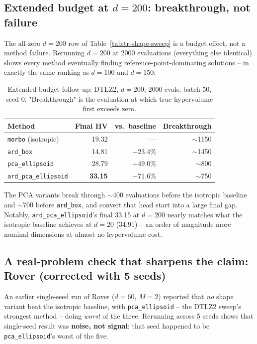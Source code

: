\documentclass[11pt]{article}
\begin{document}
\subsection{Extended budget at $d=200$: breakthrough, not failure}

The all-zero $d=200$ row of Table~\ref{tab:tr-shape-sweep} is a budget
effect, not a method failure. Rerunning $d=200$ at $2000$ evaluations
(everything else identical) shows every method eventually finding
reference-point-dominating solutions -- in exactly the same ranking as
$d=100$ and $d=150$:

\begin{table}[h]
\centering
\caption{Extended-budget follow-up: DTLZ2, $d=200$, 2000 evals, batch 50,
seed 0. "Breakthrough" is the evaluation at which true hypervolume first
exceeds zero.}
\label{tab:tr-shape-200d-2000ev}
\begin{tabular}{lrrr}
\toprule
Method & Final HV & vs.\ baseline & Breakthrough \\
\midrule
\texttt{morbo} (isotropic) & 19.32 & --- & $\sim$1150 \\
\texttt{ard\_box} & 14.81 & $-23.4\%$ & $\sim$1450 \\
\texttt{pca\_ellipsoid} & 28.79 & $+49.0\%$ & $\sim$800 \\
\texttt{ard\_pca\_ellipsoid} & \textbf{33.15} & $\mathbf{+71.6\%}$ & $\sim$750 \\
\bottomrule
\end{tabular}
\end{table}

The PCA variants break through $\sim$400 evaluations before the isotropic
baseline and $\sim$700 before \texttt{ard\_box}, and convert that head
start into a large final gap. Notably, \texttt{ard\_pca\_ellipsoid}'s
final 33.15 at $d=200$ nearly matches what the isotropic baseline achieves
at $d=20$ (34.91) -- an order of magnitude more nominal dimensions at
almost no hypervolume cost.

\subsection{A real-problem check that sharpens the claim: Rover (corrected with 5 seeds)}

An earlier single-seed run of Rover ($d=60$, $M=2$) reported that
\emph{no} shape variant beat the isotropic baseline, with
\texttt{pca\_ellipsoid} -- the DTLZ2 sweep's strongest method -- doing
\emph{worst} of the three. Rerunning across 5 seeds shows that single-seed
result was \textbf{noise, not signal}: that seed happened to be
\texttt{pca\_ellipsoid}'s worst of the five.
\end{document}
